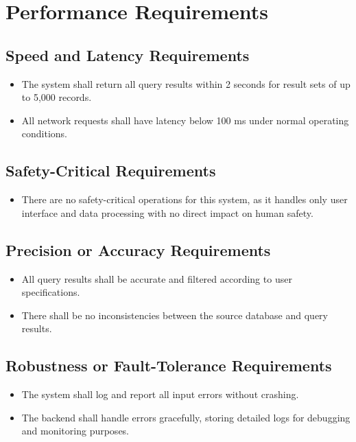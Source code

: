 \documentclass[12pt]{article}
\begin{document}
\section{Performance Requirements}

\subsection{Speed and Latency Requirements}
\begin{itemize}
    \item The system shall return all query results within 2 seconds for result sets of up to 5,000 records.
    \item All network requests shall have latency below 100 ms under normal operating conditions.
\end{itemize}

\subsection{Safety-Critical Requirements}
\begin{itemize}
    \item There are no safety-critical operations for this system, as it handles only user interface and data processing with no direct impact on human safety.
\end{itemize}

\subsection{Precision or Accuracy Requirements}
\begin{itemize}
    \item All query results shall be accurate and filtered according to user specifications.
    \item There shall be no inconsistencies between the source database and query results.
\end{itemize}

\subsection{Robustness or Fault-Tolerance Requirements}
\begin{itemize}
    \item The system shall log and report all input errors without crashing.
    \item The backend shall handle errors gracefully, storing detailed logs for debugging and monitoring purposes.
\end{itemize}
\end{document}

